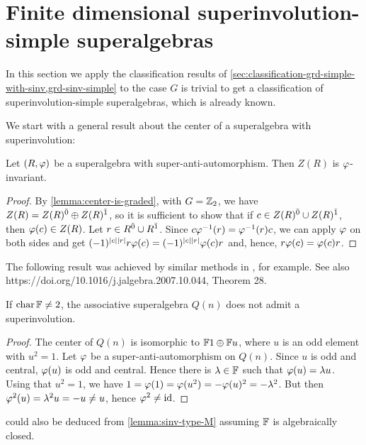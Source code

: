 
\section[Finite dimensional superinvolution-simple superalgebras]{Finite dimensional superinvolution-simple superalgebras}

In this section we apply the classification results of \cref{sec:classification-grd-simple-with-sinv,grd-sinv-simple} to the case $G$ is trivial to get a classification of superinvolution-simple superalgebras, which is already known. 

We start with a general result about the center of a superalgebra with superinvolution: 

\begin{lemma}
	Let $(R, \varphi)$ be a superalgebra with super-anti-automorphism.
	Then $Z(R)$ is $\varphi$-invariant.
\end{lemma}

\begin{proof}
	By \cref{lemma:center-is-graded}, with $G = \mathbb{Z}_2$, we have $Z(R) = Z(R)^{\bar0} \oplus Z(R)^{\bar1}$, so it is sufficient to show that if $c \in Z(R)^{\bar0} \cup Z(R)^{\bar1}$, then $\varphi(c) \in Z(R)$. 
	Let $r \in R^{\bar0} \cup R^{\bar1}$.
	Since $c\varphi^{-1} (r) = \varphi^{-1} (r)c$, we can apply $\varphi$ on both sides and get $(-1)^{|c||r|} r \varphi(c) = (-1)^{|c||r|} \varphi(c) r$ and, hence, $r \varphi(c) = \varphi(c) r$.
\end{proof}

The following result was achieved by similar methods in \cite[Theorem 8.1]{Sh98}, for example. 
See also https://doi.org/10.1016/j.jalgebra.2007.10.044, Theorem 28.

\begin{cor}\label{cor:Q-no-sinv-center}
	If $\operatorname{char} \mathbb{F} \neq 2$, the associative superalgebra $Q(n)$ does not admit a superinvolution.
\end{cor}

\begin{proof}
	The center of $Q(n)$ is isomorphic to $\mathbb{F}1 \oplus \mathbb{F} u$, where $u$ is an odd element with $u^2 = 1$.
	Let $\varphi$ be a super-anti-automorphism on $Q(n)$.
	Since $u$ is odd and central, $\varphi(u)$ is odd and central.
	Hence there is $\lambda \in \mathbb{F}$ such that $\varphi(u) = \lambda u$.
	Using that $u^2 = 1$, we have $1 = \varphi(1) = \varphi(u^2) = - \varphi(u)^2 = - \lambda^2$.
	But then $\varphi^2 (u) = \lambda^2 u = -u \neq u$, hence $\varphi^2 \neq \operatorname{id}$.
\end{proof}

\begin{remark}
     could also be deduced from \cref{lemma:sinv-type-M} assuming $\mathbb{F}$ is algebraically closed. 
\end{remark}

